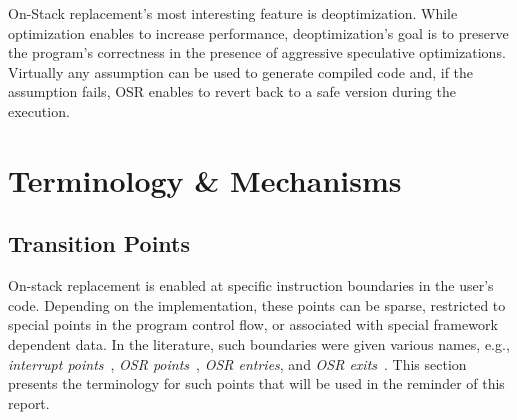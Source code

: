 On-Stack replacement's most interesting feature is deoptimization. 
While optimization enables to increase performance, deoptimization's goal is to preserve the program's correctness in the presence of aggressive speculative optimizations. 
Virtually any assumption can be used to generate compiled code and, if the assumption fails, 
OSR enables to revert back to a safe version during the execution.\\

\section{Terminology \& Mechanisms}

\subsection{Transition Points}\label{section:osrpoints}
On-stack replacement is enabled at specific instruction boundaries in the user's code.
Depending on the implementation, these points can be sparse, restricted to special points in the program control flow, or associated with special framework dependent data.
In the literature, such boundaries were given various names, e.g., \textit{interrupt points}~\cite{holzle1992debugging}, \textit{OSR points}~\cite{fink2003design, holzle1992debugging, WebKitURL, lameed2013modular}, \textit{OSR entries}, and \textit{OSR exits}~\cite{WebKitURL, lameed2013modular}.
This section presents the terminology for such points that will be used in the reminder of this report.

